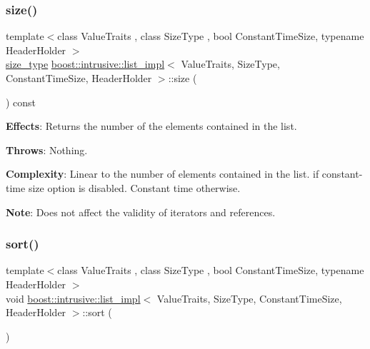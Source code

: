 \subsubsection{\texorpdfstring{size()}{size()}}
{\footnotesize\ttfamily template$<$class Value\+Traits , class Size\+Type , bool Constant\+Time\+Size, typename Header\+Holder $>$ \\
\hyperlink{classboost_1_1intrusive_1_1list__impl_a3e340b93081e392fba09de7145fb5733}{size\+\_\+type} \hyperlink{classboost_1_1intrusive_1_1list__impl}{boost\+::intrusive\+::list\+\_\+impl}$<$ Value\+Traits, Size\+Type, Constant\+Time\+Size, Header\+Holder $>$\+::size (\begin{DoxyParamCaption}{ }\end{DoxyParamCaption}) const\hspace{0.3cm}{\ttfamily [inline]}}

{\bfseries Effects}\+: Returns the number of the elements contained in the list.

{\bfseries Throws}\+: Nothing.

{\bfseries Complexity}\+: Linear to the number of elements contained in the list. if constant-\/time size option is disabled. Constant time otherwise.

{\bfseries Note}\+: Does not affect the validity of iterators and references. \mbox{\label{classboost_1_1intrusive_1_1list__impl_abc510cb71270fe4ee9e5f8c7ba8e3aa0}} 
\subsubsection{\texorpdfstring{sort()}{sort()}\hspace{0.1cm}{\footnotesize\ttfamily [1/2]}}
{\footnotesize\ttfamily template$<$class Value\+Traits , class Size\+Type , bool Constant\+Time\+Size, typename Header\+Holder $>$ \\
void \hyperlink{classboost_1_1intrusive_1_1list__impl}{boost\+::intrusive\+::list\+\_\+impl}$<$ Value\+Traits, Size\+Type, Constant\+Time\+Size, Header\+Holder $>$\+::sort (\begin{DoxyParamCaption}{ }\end{DoxyParamCaption})\hspace{0.3cm}{\ttfamily [inline]}}

